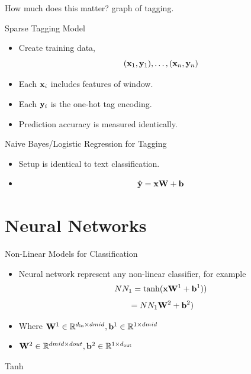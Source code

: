 \documentclass{beamer}
\begin{document}
\begin{frame}{How much does this matter?}
  graph of tagging.
\end{frame}

\begin{frame}{Sparse Tagging Model}
  \begin{itemize}
  \item Create training data,
    \[ (\mathbf{x}_1, \mathbf{y}_1),\ldots , (\mathbf{x}_n, \mathbf{y}_n)\]
  \item Each $\mathbf{x}_i$ includes features of window.
  \item Each $\mathbf{y}_i$ is the one-hot tag encoding.
  \item Prediction accuracy is measured identically. 
  \end{itemize}
\end{frame}


\begin{frame}{Naive Bayes/Logistic Regression for Tagging}
  \begin{itemize}
  \item Setup is identical to text classification.

  \item \[ \hat{\mathbf{y}} = \mathbf{x} \mathbf{W} + \bold b \] 
  \end{itemize}
\end{frame}

\section{Neural Networks}


\begin{frame}{Non-Linear Models for Classification}
  \begin{itemize}
  \item Neural network represent any non-linear classifier, for example
    \[ NN_1 = \tanh(\mathbf{x} \mathbf{W}^1 + \mathbf{b}^1))  \]
    \[ \ = NN_1 \mathbf{W}^2 + \mathbf{b}^2)  \]
  \item Where $\mathbf{W}^1 \in \mathbb{R}^{{d_{\mathrm{in}}} \times dmid}, \mathbf{b}^1 \in \mathbb{R}^{1\times dmid}$
  \item  $\mathbf{W}^2 \in \mathbb{R}^{dmid \times dout}, \mathbf{b}^2 \in \mathbb{R}^{1\times {d_{\mathrm{out}}}}$
  \end{itemize}
\end{frame}

\begin{frame}{Tanh}
  
\end{frame}
\end{document}
